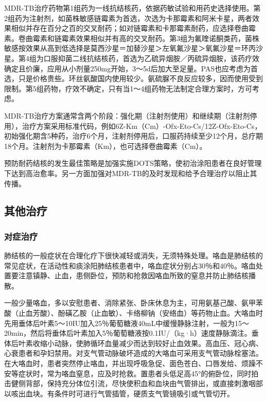 MDR-TB治疗药物第1组药为一线抗结核药，依据药敏试验和用药史选择使用。第2组药为注射剂，如菌株敏感链霉素为首选，次选为卡那霉素和阿米卡星，两者效果相似并存在百分之百的交叉耐药；如对链霉素和卡那霉素耐药，应选择卷曲霉素。卷曲霉素和链霉素效果相似并有高的交叉耐药。第3组为氟喹诺酮类药，菌株敏感按效果从高到低选择是莫西沙星＝加替沙星＞左氧氟沙星＞氧氟沙星＝环丙沙星。第4组为口服抑菌二线抗结核药，首选为乙硫异烟胺／丙硫异烟胺，该药疗效确定且价廉，应用从小剂量250mg开始，3～5d后加大至足量。PAS也应考虑为首选，只是价格贵些。环丝氨酸国内使用较少。氨硫脲不良反应较多，因而使用受到限制。第5组药物，疗效不确定，只有当1～4组药物无法制定合理方案时，方可考虑。

MDR-TB治疗方案通常含两个阶段：强化期（注射剂使用）和继续期（注射剂停用），治疗方案采用标准代码，例如6Z-Km（Cm）-Ofx-Eto-Cs/12Z-Ofx-Eto-Cs，初始强化期含5种药，治疗6个月，注射剂停用后，口服药持续至少12个月，总疗期18个月。注射剂为卡那霉素（Km），也可选择卷曲霉素（Cm）。

预防耐药结核的发生最佳策略是加强实施DOTS策略，使初治涂阳患者在良好管理下达到高治愈率。另一方面加强对MDR-TB的及时发现和给予合理治疗以阻止其传播。

\subsection{其他治疗}

\subsubsection{对症治疗}

肺结核的一般症状在合理化疗下很快减轻或消失，无须特殊处理。咯血是肺结核的常见症状，在活动性和痰涂阳肺结核患者中，咯血症状分别占30％和40％。咯血处置要注意镇静、止血，患侧卧位，预防和抢救因咯血所致的窒息并防止肺结核播散。

一般少量咯血，多以安慰患者、消除紧张、卧床休息为主，可用氨基己酸、氨甲苯酸（止血芳酸）、酚磺乙胺（止血敏）、卡络柳钠（安络血）等药物止血。大咯血时先用垂体后叶素5～10IU加入25％葡萄糖液40mL中缓慢静脉注射，一般为15～20min，然后将垂体后叶素加入5％葡萄糖液按0.1IU/（kg·h）速度静脉滴注。垂体后叶素收缩小动脉，使肺循环血量减少而达到较好止血效果。高血压、冠心病、心衰患者和孕妇禁用。对支气管动脉破坏造成的大咯血可采用支气管动脉栓塞法。在大咯血时，患者突然停止咯血，并出现呼吸急促、面色苍白、口唇发给、烦躁不安等症状时，常为咯血窒息，应及时抢救。置患者头低足高45°的俯卧位，同时拍击健侧背部，保持充分体位引流，尽快使积血和血块由气管排出，或直接刺激咽部以咳出血块。有条件时可进行气管插管，硬质支气管镜吸引或气管切开。

